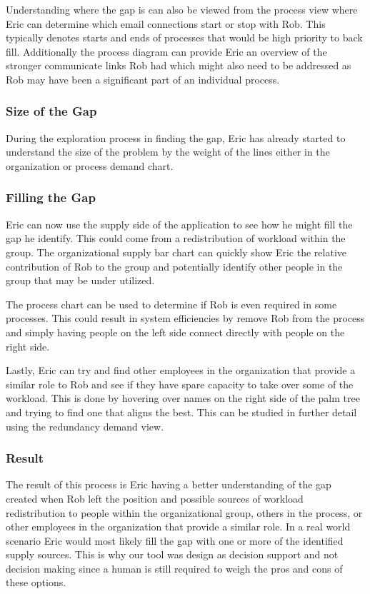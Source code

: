 \documentclass[journal]{vgtc}                %
\begin{document}
Understanding where the gap is can also be viewed from the process view where Eric can determine which email connections start or stop with Rob.  This typically denotes starts and ends of processes that would be high priority to back fill.  Additionally the process diagram can provide Eric an overview of the stronger communicate links Rob had which might also need to be addressed as Rob may have been a significant part of an individual process.

\subsubsection{Size of the Gap}
During the exploration process in finding the gap, Eric has already started to understand the size of the problem by the weight of the lines either in the organization or process demand chart.

\subsubsection{Filling the Gap}
Eric can now use the supply side of the application to see how he might fill the gap he identify.  This could come from a redistribution of workload within the group.  The organizational supply bar chart can quickly show Eric the relative contribution of Rob to the group and potentially identify other people in the group that may be under utilized.

The process chart can be used to determine if Rob is even required in some processes.  This could result in system efficiencies by remove Rob from the process and simply having people on the left side connect directly with people on the right side.

Lastly, Eric can try and find other employees in the organization that provide a similar role to Rob and see if they have spare capacity to take over some of the workload.  This is done by hovering over names on the right side of the palm tree and trying to find one that aligns the best.  This can be studied in further detail using the redundancy demand view.

\subsubsection{Result}
The result of this process is Eric having a better understanding of the gap created when Rob left the position and possible sources of workload redistribution to people within the organizational group, others in the process, or other employees in the organization that provide a similar role.
In a real world scenario Eric would most likely fill the gap with one or more of the identified supply sources.  This is why our tool was design as decision support and not decision making since a human is still required to weigh the pros and cons of these options.
\end{document}

